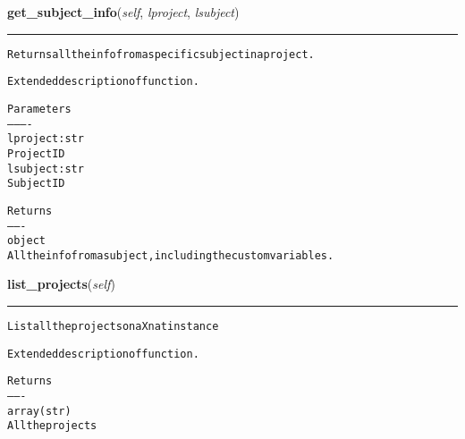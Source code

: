     \label{source:Xnat:Xnat:get_subject_info}

    \vspace{0.5ex}

\hspace{.8\funcindent}\begin{boxedminipage}{\funcwidth}

    \raggedright \textbf{get\_subject\_info}(\textit{self}, \textit{lproject}, \textit{lsubject})

    \vspace{-1.5ex}

    \rule{\textwidth}{0.5\fboxrule}
\setlength{\parskip}{2ex}
\begin{alltt}

Returns all the info from a specific subject in a project.

Extended description of function.

Parameters
----------
lproject : str
    Project ID
lsubject : str
    Subject ID

Returns
-------
object
    All the info from a subject, including the custom variables.
\end{alltt}

\setlength{\parskip}{1ex}
    \end{boxedminipage}

    \label{source:Xnat:Xnat:list_projects}

    \vspace{0.5ex}

\hspace{.8\funcindent}\begin{boxedminipage}{\funcwidth}

    \raggedright \textbf{list\_projects}(\textit{self})

    \vspace{-1.5ex}

    \rule{\textwidth}{0.5\fboxrule}
\setlength{\parskip}{2ex}
\begin{alltt}

List all the projects on a Xnat instance

Extended description of function.

Returns
-------
array(str)
    All the projects
\end{alltt}

\setlength{\parskip}{1ex}
    \end{boxedminipage}

